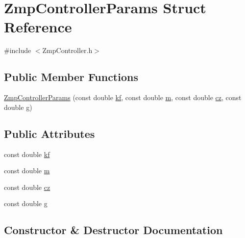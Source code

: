 \hypertarget{structZmpControllerParams}{}\section{Zmp\+Controller\+Params Struct Reference}
\label{structZmpControllerParams}


{\ttfamily \#include $<$Zmp\+Controller.\+h$>$}

\subsection*{Public Member Functions}
\begin{DoxyCompactItemize}
\item 
\hyperlink{structZmpControllerParams_abc760a62d699e07d034bc351ad52fcdd}{Zmp\+Controller\+Params} (const double \hyperlink{structZmpControllerParams_a6138cbf819799519abd3864bd8bf05cf}{kf}, const double \hyperlink{structZmpControllerParams_a1a3eea24e276953f2e74c4066b24106c}{m}, const double \hyperlink{structZmpControllerParams_ae0d24b7bdae3eb228b9db827934d0e87}{cz}, const double \hyperlink{structZmpControllerParams_af97a6bcc6b60e8372dd444d695d705f7}{g})
\end{DoxyCompactItemize}
\subsection*{Public Attributes}
\begin{DoxyCompactItemize}
\item 
const double \hyperlink{structZmpControllerParams_a6138cbf819799519abd3864bd8bf05cf}{kf}
\item 
const double \hyperlink{structZmpControllerParams_a1a3eea24e276953f2e74c4066b24106c}{m}
\item 
const double \hyperlink{structZmpControllerParams_ae0d24b7bdae3eb228b9db827934d0e87}{cz}
\item 
const double \hyperlink{structZmpControllerParams_af97a6bcc6b60e8372dd444d695d705f7}{g}
\end{DoxyCompactItemize}


\subsection{Constructor \& Destructor Documentation}
\hypertarget{structZmpControllerParams_abc760a62d699e07d034bc351ad52fcdd}{}\label{structZmpControllerParams_abc760a62d699e07d034bc351ad52fcdd} 
